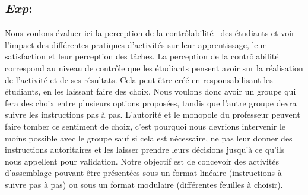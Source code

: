     \subsection{\textit{Exp}:  }\label{Exp:dragster}
            Nous voulons évaluer ici la perception de la contrôlabilité~ des étudiants et voir l’impact des différentes pratiques d’activités sur leur apprentissage, leur satisfaction et leur perception des tâches.
            La perception de la contrôlabilité correspond au niveau de contrôle que les étudiants pensent avoir sur la réalisation de l'activité et de ses résultats. Cela peut être créé en responsabilisant les étudiants, en les laissant faire des choix. Nous voulons donc avoir un groupe qui fera des choix entre plusieurs options proposées, tandis que l’autre groupe devra suivre les instructions pas à pas.
            L’autorité et le monopole du professeur peuvent faire tomber ce sentiment de choix, c’est pourquoi nous devrions intervenir le moins possible avec le groupe sauf si cela est nécessaire, ne pas leur donner des instructions autoritaires et les laisser prendre leurs décisions jusqu’à ce qu’ils nous appellent pour validation. Notre objectif est de concevoir des activités d’assemblage pouvant être présentées sous un format linéaire (instructions à suivre pas à pas) ou sous un format modulaire (différentes feuilles à choisir).
